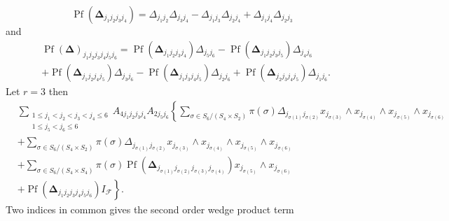 \documentclass[aps, preprint]{revtex4}
\begin{document}
\begin{equation}\ensuremath{\operatorname*{Pf}} \left (\mathbf{\Delta }_{j_{1} j_{2} j_{3} j_{4}}\right ) = \Delta _{j_{1} j_{2}} \Delta _{j_{3} j_{4}} -  \Delta _{j_{1} j_{3}} \Delta _{j_{2} j_{4}} +  \Delta _{j_{1} j_{4}} \Delta _{j_{2} j_{3}}
\end{equation}and
\begin{align} & \ensuremath{\operatorname*{Pf}} \left (\mathbf{\Delta }\right )_{j_{1} j_{2} j_{3} j_{4} j_{5} j_{6}} =\ensuremath{\operatorname*{Pf}} \left (\mathbf{\Delta }_{j_{1} j_{2} j_{3} j_{4}}\right )  \Delta _{j_{5} j_{6}} -\ensuremath{\operatorname*{Pf}} \left (\mathbf{\Delta }_{j_{1} j_{2} j_{3} j_{5}}\right ) \Delta _{j_{4} j_{6}} \nonumber  \\
 &  +\ensuremath{\operatorname*{Pf}} \left (\mathbf{\Delta }_{j_{1} j_{2} j_{4} j_{5}}\right )  \Delta _{j_{3} j_{6}} -\ensuremath{\operatorname*{Pf}} \left (\mathbf{\Delta }_{j_{1} j_{3} j_{4} j_{5}}\right )  \Delta _{j_{2} j_{6}} +\ensuremath{\operatorname*{Pf}} \left (\mathbf{\Delta }_{j_{2} j_{3} j_{4} j_{5}}\right ) \Delta _{j_{1} j_{6}}\text{.}\end{align}Let $r =3$ then
\begin{align} & \sum _{\begin{array}{c}1 \leq j_{1} <j_{2} <j_{3} <j_{4} \leq 6 \\
1 \leq j_{5} <j_{6} \leq 6\end{array}}A_{4 j_{1} j_{2} j_{3} j_{4}} A_{2 j_{5} j_{6}}\left \{\sum _{\sigma  \in S_{6}/\left (S_{4} \times S_{2}\right )}\pi  \left (\sigma \right )  \Delta _{j_{\sigma  \left (1\right )} j_{\sigma  \left (2\right )}}x_{j_{\sigma  \left (3\right )}} \wedge x_{j_{\sigma  \left (4\right )}} \wedge x_{j_{\sigma  \left (5\right )}} \wedge x_{j_{\sigma  \left (6\right )}}\right . \nonumber  \\
 &  +\sum _{\sigma  \in S_{6}/\left (S_{4} \times S_{2}\right )}\pi  \left (\sigma \right )  \Delta _{j_{\sigma  \left (1\right )} j_{\sigma  \left (2\right )}}x_{j_{\sigma  \left (3\right )}} \wedge x_{j_{\sigma  \left (4\right )}} \wedge x_{j_{\sigma  \left (5\right )}} \wedge x_{j_{\sigma  \left (6\right )}} \nonumber  \\
 &  +\sum _{\sigma  \in S_{6}/\left (S_{4} \times S_{4}\right )}\pi  \left (\sigma \right ) \ensuremath{\operatorname*{Pf}} \left (\mathbf{\Delta }_{j_{\sigma  \left (1\right )} j_{\sigma  \left (2\right )} j_{\sigma  \left (3\right )} j_{\sigma  \left (4\right )}}\right ) x_{j_{\sigma  \left (5\right )}} \wedge x_{j_{\sigma  \left (6\right )}} \nonumber  \\
 &  +\left .\ensuremath{\operatorname*{Pf}} \left (\mathbf{\Delta }_{j_{1} j_{2} j_{3} j_{4} j_{5} j_{6}}\right ) I_{\mathcal{F}}\right \}\text{.}\end{align}Two indices in common gives the second order wedge product term
\end{document}
